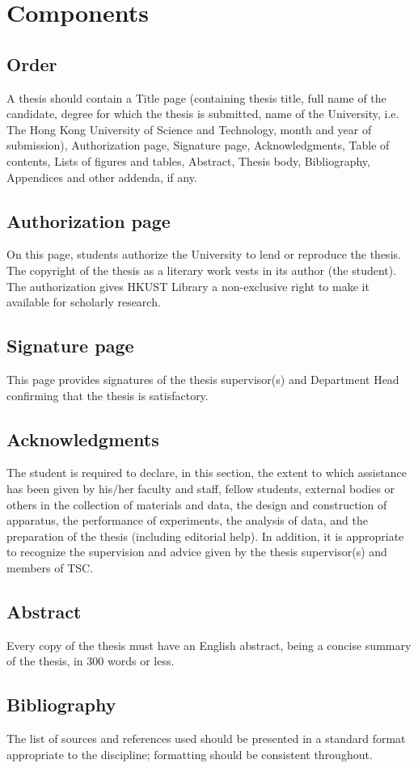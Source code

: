 \section{Components}
\subsection{Order}
A thesis should contain a Title page (containing thesis title, full name of the candidate, degree for which the thesis is submitted, name of the University, i.e. The Hong Kong University of Science and Technology, month and year of submission), Authorization page, Signature page, Acknowledgments, Table of contents, Lists of figures and tables, Abstract, Thesis body, Bibliography, Appendices and other addenda, if any.
\subsection{Authorization page}
On this page, students authorize the University to lend or reproduce the thesis. The copyright of the thesis as a literary work vests in its author (the student). The authorization gives HKUST Library a non-exclusive right to make it available for scholarly research.
\subsection{Signature page}
This page provides signatures of the thesis supervisor(s) and Department Head confirming that the thesis is satisfactory.
\subsection{Acknowledgments}
The student is required to declare, in this section, the extent to which assistance has been given by his/her faculty and staff, fellow students, external bodies or others in the collection of materials and data, the design and construction of apparatus, the performance of experiments, the analysis of data, and the preparation of the thesis (including editorial help). In addition, it is appropriate to recognize the supervision and advice given by the thesis supervisor(s) and members of TSC.
\subsection{Abstract}
Every copy of the thesis must have an English abstract, being a concise summary of the thesis, in 300 words or less.
\subsection{Bibliography}
The list of sources and references used should be presented in a standard format appropriate to the discipline; formatting should be consistent throughout.
